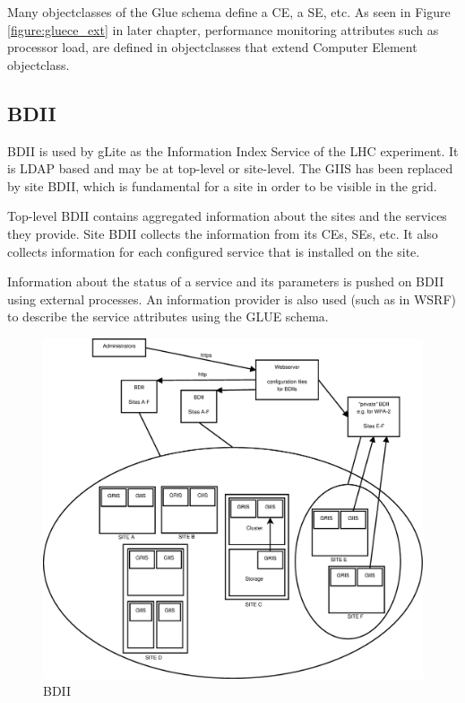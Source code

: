 Many objectclasses of the Glue schema define a \ac{CE}, a \ac{SE}, etc. As seen in Figure \ref{figure:gluece_ext} in later chapter, performance monitoring attributes such as processor load, are defined in objectclasses that extend Computer Element objectclass.

\subsection{BDII}\label{subsec:BDII}
\ac{BDII} is used by gLite as the Information Index Service of the \ac{LHC} experiment. It is LDAP based and may be at top-level or site-level. The \ac{GIIS} has been replaced by site \ac{BDII}, which is fundamental for a site in order to be visible in the grid.

Top-level \ac{BDII} contains aggregated information about the sites and the services they provide. Site \ac{BDII} collects the information from its \acp{CE}, \acp{SE}, etc. It also collects information for each configured service that is installed on the site.

Information about the status of a service and its parameters is pushed on \ac{BDII} using external processes. An information provider is also used (such as in \ac{WSRF}) to describe the service attributes using the \ac{GLUE} schema.

\begin{figure}[htb]
\centering
 \includegraphics[width=130mm]{images/bdii.eps}
\caption{\ac{BDII}}
\label{figure:bdii}
\end{figure}

